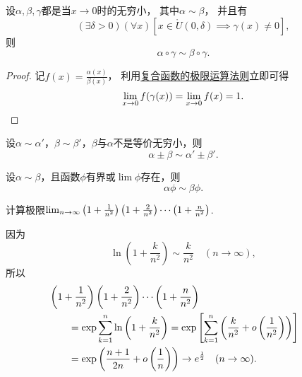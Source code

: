 \begin{proposition}[等价无穷小的换元法]
设\(\alpha,\beta,\gamma\)都是当\(x\to0\)时的无穷小，
其中\(\alpha \sim \beta\)，
并且有\[
	(\exists\delta>0)
	(\forall x)
	[
		x\in\mathring{U}(0,\delta)
		\implies
		\gamma(x) \neq 0
	],
\]
则\[
	\alpha\circ\gamma \sim \beta\circ\gamma.
\]
\begin{proof}
记\(f(x) = \frac{\alpha(x)}{\beta(x)}\)，
利用\hyperref[theorem:极限.复合函数的极限运算法则1]{复合函数的极限运算法则}立即可得\[
	\lim_{x\to0} f(\gamma(x))
	= \lim_{x\to0} f(x)
	= 1.
	\qedhere
\]
\end{proof}
\end{proposition}

\begin{proposition}[和差代替规则]\label{theorem:极限.无穷小的比较4}
设\(\alpha\sim\alpha'\)，\(\beta\sim\beta'\)，\(\beta\)与\(\alpha\)不是等价无穷小，则\[
	\alpha\pm\beta\sim\alpha'\pm\beta'.
\]
\end{proposition}

\begin{proposition}[因式代替规则]\label{theorem:极限.无穷小的比较5}
设\(\alpha\sim\beta\)，且函数\(\phi\)有界或\(\lim\phi\)存在，则\[
	\alpha \phi \sim \beta \phi.
\]
\end{proposition}

\begin{example}
计算极限\(\lim_{n\to\infty} \left(1+\frac1{n^2}\right)\left(1+\frac2{n^2}\right)\dotsm\left(1+\frac{n}{n^2}\vphantom{\frac1{n^2}}\right)\).
\begin{solution}
因为\[
	\ln\left(1+\frac{k}{n^2}\right)
	\sim \frac{k}{n^2}
	\quad(n\to\infty),
\]
所以\begin{align*}
	&\hspace{-20pt}
	\left(1+\frac1{n^2}\right)\left(1+\frac2{n^2}\right)\dotsm\left(1+\frac{n}{n^2}\vphantom{\frac1{n^2}}\right) \\
	&= \exp\sum_{k=1}^n \ln\left(1+\frac{k}{n^2}\right)
	= \exp\left[ \sum_{k=1}^n \left(\frac{k}{n^2} + o\left(\frac1{n^2}\right)\right) \right] \\
	&= \exp\left( \frac{n+1}{2n} + o\left(\frac1n\right) \right)
	\to e^{\frac12}
	\quad(n\to\infty).
\end{align*}
\end{solution}
\end{example}

